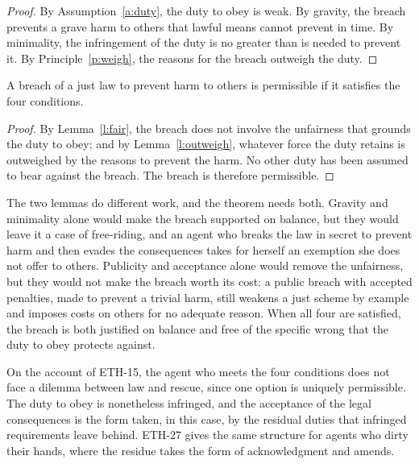 \documentclass{situationist-preprint}
\begin{document}
\begin{proof}
By Assumption~\ref{a:duty}, the duty to obey is weak. By gravity, the breach prevents a grave harm to others that lawful means cannot prevent in time. By minimality, the infringement of the duty is no greater than is needed to prevent it. By Principle~\ref{p:weigh}, the reasons for the breach outweigh the duty.
\end{proof}

\begin{theorem}\label{t:main}
A breach of a just law to prevent harm to others is permissible if it satisfies the four conditions.
\end{theorem}

\begin{proof}
By Lemma~\ref{l:fair}, the breach does not involve the unfairness that grounds the duty to obey; and by Lemma~\ref{l:outweigh}, whatever force the duty retains is outweighed by the reasons to prevent the harm. No other duty has been assumed to bear against the breach. The breach is therefore permissible.
\end{proof}

The two lemmas do different work, and the theorem needs both. Gravity and minimality alone would make the breach supported on balance, but they would leave it a case of free-riding, and an agent who breaks the law in secret to prevent harm and then evades the consequences takes for herself an exemption she does not offer to others. Publicity and acceptance alone would remove the unfairness, but they would not make the breach worth its cost: a public breach with accepted penalties, made to prevent a trivial harm, still weakens a just scheme by example and imposes costs on others for no adequate reason. When all four are satisfied, the breach is both justified on balance and free of the specific wrong that the duty to obey protects against.

\begin{remark}\label{r:remainder}
On the account of ETH-15, the agent who meets the four conditions does not face a dilemma between law and rescue, since one option is uniquely permissible. The duty to obey is nonetheless infringed, and the acceptance of the legal consequences is the form taken, in this case, by the residual duties that infringed requirements leave behind. ETH-27 gives the same structure for agents who dirty their hands, where the residue takes the form of acknowledgment and amends.
\end{remark}
\end{document}

